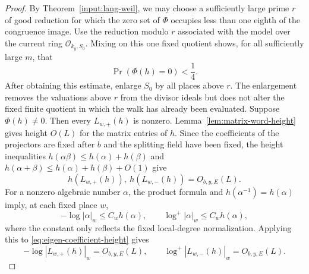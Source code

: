 \documentclass[11pt,reqno]{amsart}
\theoremstyle{definition}
\theoremstyle{remark}
\newcommand{\cO}{\mathcal O}
\begin{document}
\begin{proof}
By Theorem~\ref{input:lang-weil}, we may choose a sufficiently large prime
\(r\) of good reduction for which the zero set of \(\Phi\) occupies less
than one eighth of the congruence image.  Use the reduction modulo \(r\)
associated with
the model over the current ring \(\cO_{k_y,S_0}\).  Mixing on this one fixed
quotient shows, for all sufficiently large \(m\), that
\begin{equation}\label{eq:phi-probability}
 \Pr(\Phi(h)=0)<\frac14.
\end{equation}
After obtaining this estimate, enlarge \(S_0\) by all places above \(r\).
The enlargement removes the valuations above \(r\) from the divisor ideals
but does not alter the fixed finite quotient in which the walk has already
been evaluated.
Suppose \(\Phi(h)\ne0\).  Then every \(L_{w,+}(h)\) is nonzero.
Lemma~\ref{lem:matrix-word-height} gives height \(O(L)\) for the matrix
entries of \(h\).  Since the coefficients of the projectors are fixed after
\(b\) and the splitting field have been fixed, the height inequalities
\(h(\alpha\beta)\le h(\alpha)+h(\beta)\) and
\(h(\alpha+\beta)\le h(\alpha)+h(\beta)+O(1)\) give
\begin{equation}\label{eq:eigen-coefficient-height}
 h(L_{w,+}(h)),\ h(L_{w,-}(h))=O_{b,y,E}(L).
\end{equation}
For a nonzero algebraic number \(\alpha\), the product formula and
\(h(\alpha^{-1})=h(\alpha)\) imply, at each fixed place \(w\),
\[
 -\log|\alpha|_w\le C_w h(\alpha),
 \qquad \log^+|\alpha|_w\le C_w h(\alpha),
\]
where the constant only reflects the fixed local-degree normalization.
Applying this to \eqref{eq:eigen-coefficient-height} gives
\begin{equation}\label{eq:eigen-coefficient-local}
 -\log|L_{w,+}(h)|_w=O_{b,y,E}(L),
 \qquad
 \log^+|L_{w,-}(h)|_w=O_{b,y,E}(L).
\end{equation}


\end{proof}
\end{document}
